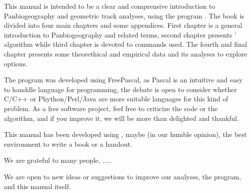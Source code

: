 This manual is intended to be a clear and comprensive 
introduction to Panbiogeography and geometric track analyses, using the program \MT. 
The book is divided into four main chapters and some appendices.
First chapter is a general introduction to Panbiogeography and related terms, second chapter presents
\MT' algorithm while third chapter is devoted to commands used. The fourth and final chapter presents
some theorethical and empirical data and its analyses to explore \MT options.


\vspace{-7\baselineskip}
\vspace{7\baselineskip}


The program was developed using FreePascal, as Pascal is an intuitive and easy to handdle language for programming, 
the debate is open to consider whether C/C++ or Phython/Perl/Java are more suitable languages for this kind of problem. As a free
software project, feel free to criticize the code or the algorithm, and if you improve it, we will be more than delighted and thankful. 


\vspace{-7\baselineskip}
\vspace{7\baselineskip}

This manual has been developed using \TL, maybe (in our humble opinion), the best environment to write a book or a handout.



We are grateful to many people, .....

We are open to new ideas or suggestions to improve our analyses, the program, and this manual itself. 

\vspace{-7\baselineskip}
\vspace{7\baselineskip}